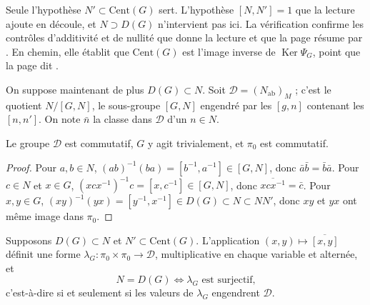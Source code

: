 \begin{remarque}
Seule l'hypothèse $N' \subset \mathrm{Cent}(G)$ sert. L'hypothèse $[N, N'] = 1$ que la lecture ajoute en découle, et $N \supset D(G)$ n'intervient pas ici. La vérification confirme les contrôles d'additivité et de nullité que donne la lecture et que la page résume par . En chemin, elle établit que $\mathrm{Cent}(G)$ est l'image inverse de $\operatorname{Ker}\Psi_G$, point que la page dit .
\end{remarque}

On suppose maintenant de plus $D(G) \subset N$. Soit $\mathcal D = (N_{\mathrm{ab}})_M$ ; c'est le quotient $N/[G, N]$, le sous-groupe $[G, N]$ engendré par les $[g, n]$ contenant les $[n, n']$. On note $\bar n$ la classe dans $\mathcal D$ d'un $n \in N$.

\begin{lemme}\label{lem:133-D}
Le groupe $\mathcal D$ est commutatif, $G$ y agit trivialement, et $\pi_0$ est commutatif.
\end{lemme}

\begin{proof}
Pour $a, b \in N$, $(ab)^{-1}(ba) = [b^{-1}, a^{-1}] \in [G, N]$, donc $\bar a\bar b = \bar b\bar a$. Pour $c \in N$ et $x \in G$, $(xcx^{-1})^{-1}c = [x, c^{-1}] \in [G, N]$, donc $\overline{xcx^{-1}} = \bar c$. Pour $x, y \in G$, $(xy)^{-1}(yx) = [y^{-1}, x^{-1}] \in D(G) \subset N \subset NN'$, donc $xy$ et $yx$ ont même image dans $\pi_0$.
\end{proof}

\begin{enonce}
Supposons $D(G) \subset N$ et $N' \subset \mathrm{Cent}(G)$. L'application $(x, y) \mapsto \overline{[x, y]}$ définit une forme $\lambda_G : \pi_0 \times \pi_0 \to \mathcal D$, multiplicative en chaque variable et alternée, et
\[
N = D(G) \iff \lambda_G \text{ est surjectif,}
\]
c'est-à-dire si et seulement si les valeurs de $\lambda_G$ engendrent $\mathcal D$.
\end{enonce}

